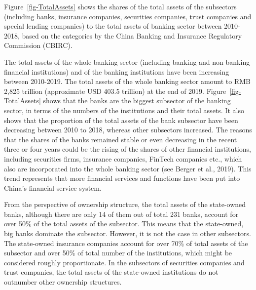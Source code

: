 \documentclass[
  12pt,
  a4paper,
]{scrreprt}
\begin{document}
Figure~\ref{fig-TotalAssets} shows the shares of the total assets of the
subsectors (including banks, insurance companies, securities companies,
trust companies and special lending companies) to the total assets of
banking sector between 2010-2018, based on the categories by the China
Banking and Insurance Regulatory Commission (CBIRC).

The total assets of the whole banking sector (including banking and
non-banking financial institutions) and of the banking institutions have
been increasing between 2010-2019. The total assets of the whole banking
sector amount to RMB 2,825 trillion (approximate USD 403.5 trillion) at
the end of 2019. Figure~\ref{fig-TotalAssets} shows that the banks are
the biggest subsector of the banking sector, in terms of the numbers of
the institutions and their total assets. It also shows that the
proportion of the total assets of the bank subsector have been
decreasing between 2010 to 2018, whereas other subsectors increased. The
reasons that the shares of the banks remained stable or even decreasing
in the recent three or four years could be the rising of the shares of
other financial institutions, including securities firms, insurance
companies, FinTech companies etc., which also are incorporated into the
whole banking sector (see Berger et al., 2019). This trend represents
that more financial services and functions have been put into China's
financial service system.

From the perspective of ownership structure, the total assets of the
state-owned banks, although there are only 14 of them out of total 231
banks, account for over 50\% of the total assets of the subsector. This
means that the state-owned, big banks dominate the subsector. However,
it is not the case in other subsectors. The state-owned insurance
companies account for over 70\% of total assets of the subsector and
over 50\% of total number of the institutions, which might be considered
roughly proportionate. In the subsectors of securities companies and
trust companies, the total assets of the state-owned institutions do not
outnumber other ownership structures.
\end{document}

